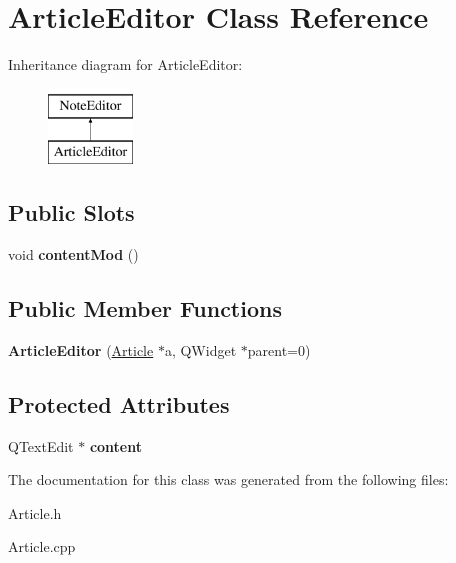 \hypertarget{classArticleEditor}{\section{\-Article\-Editor \-Class \-Reference}
\label{classArticleEditor}
}
\-Inheritance diagram for \-Article\-Editor\-:\begin{figure}[H]
\begin{center}
\leavevmode
\includegraphics[height=2.000000cm]{classArticleEditor}
\end{center}
\end{figure}
\subsection*{\-Public \-Slots}
\begin{DoxyCompactItemize}
\item 
\hypertarget{classArticleEditor_a2f371197ece3d2e741ae1676748399d8}{void {\bfseries content\-Mod} ()}\label{classArticleEditor_a2f371197ece3d2e741ae1676748399d8}

\end{DoxyCompactItemize}
\subsection*{\-Public \-Member \-Functions}
\begin{DoxyCompactItemize}
\item 
\hypertarget{classArticleEditor_a05614b57049ba0db303a571b1a8d516b}{{\bfseries \-Article\-Editor} (\hyperlink{classArticle}{\-Article} $\ast$a, \-Q\-Widget $\ast$parent=0)}\label{classArticleEditor_a05614b57049ba0db303a571b1a8d516b}

\end{DoxyCompactItemize}
\subsection*{\-Protected \-Attributes}
\begin{DoxyCompactItemize}
\item 
\hypertarget{classArticleEditor_afe9ce3d19084c00eda6c783073dd4fa0}{\-Q\-Text\-Edit $\ast$ {\bfseries content}}\label{classArticleEditor_afe9ce3d19084c00eda6c783073dd4fa0}

\end{DoxyCompactItemize}


\-The documentation for this class was generated from the following files\-:\begin{DoxyCompactItemize}
\item 
\-Article.\-h\item 
\-Article.\-cpp\end{DoxyCompactItemize}

